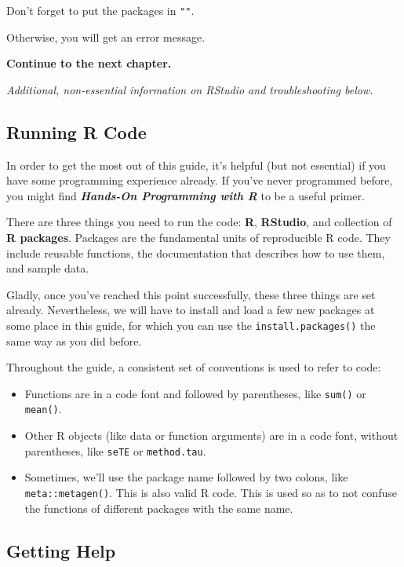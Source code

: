 \documentclass[]{book}
\providecommand{\tightlist}{%
  \setlength{\itemsep}{0pt}\setlength{\parskip}{0pt}}
\begin{document}
\begin{rmdachtung}
Don't forget to put the packages in \texttt{""}.

Otherwise, you will get an error message.
\end{rmdachtung}

\textbf{Continue to the next chapter.}

\emph{Additional, non-essential information on RStudio and troubleshooting below.}

\hypertarget{running-r-code}{%
\subsection{Running R Code}\label{running-r-code}}

In order to get the most out of this guide, it's helpful (but not essential) if you have some programming experience already. If you've never programmed before, you might find \textbf{\emph{Hands-On Programming with R}} \citep{grolemund2014hands} to be a useful primer.

There are three things you need to run the code: \textbf{R}, \textbf{RStudio}, and collection of \textbf{R packages}. Packages are the fundamental units of reproducible R code. They include reusable functions, the documentation that describes how to use them, and sample data.

Gladly, once you've reached this point successfully, these three things are set already. Nevertheless, we will have to install and load a few new packages at some place in this guide, for which you can use the \texttt{install.packages()} the same way as you did before.

Throughout the guide, a consistent set of conventions is used to refer to code:

\begin{itemize}
\tightlist
\item
  Functions are in a code font and followed by parentheses, like
  \texttt{sum()} or \texttt{mean()}.
\item
  Other R objects (like data or function arguments) are in a code
  font, without parentheses, like \texttt{seTE} or \texttt{method.tau}.
\item
  Sometimes, we'll use the package name followed by two colons, like
  \texttt{meta::metagen()}. This is also valid R code. This is used so as to not confuse the functions of different packages with the same name.
\end{itemize}

\hypertarget{getting-help}{%
\subsection{Getting Help}\label{getting-help}}
\end{document}
